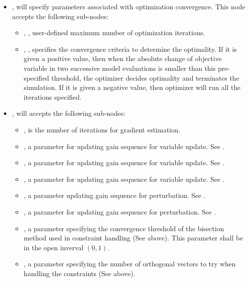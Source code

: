\begin{itemize}
\item {},  will specify parameters associated with optimization convergence. This node accepts the following sub-nodes:
  \begin{itemize}
  \item {}, , user-defined maximum number of optimization iterations.
  \item {}, , specifies the convergence criteria to determine the optimality. If it is given a positive value, then when the absolute change of objective variable in two successive model evaluations is smaller than this pre-specified threshold, the  optimizer decides optimality and terminates the simulation. If it is given a negative value, then  optimizer will run all the iterations specified.
  \end{itemize}
\item {},  will accepts the following sub-nodes:
  \begin{itemize}
  \item {},  is the number of iterations for gradient estimation.
  \item {},  a parameter for updating gain sequence for variable update. See \cite{spall1998implementation}.
  \item {},  a parameter for updating gain sequence for variable update. See \cite{spall1998implementation}.
  \item {},  a parameter for updating gain sequence for variable update. See \cite{spall1998implementation}.
  \item {},  a parameter updating gain sequence for perturbation. See \cite{spall1998implementation}.
  \item {},  a parameter for updating gain sequence for perturbation. See \cite{spall1998implementation}.
  \item {},  a parameter specifying the convergence threshold of the bisection method used in constraint handling (See above). This parameter shall be in the open inverval $(0,1)$.
  \item {},  a parameter specifying the number of orthogonal vectors to try when handling the constraints (See above).
  \end{itemize}
\end{itemize}


